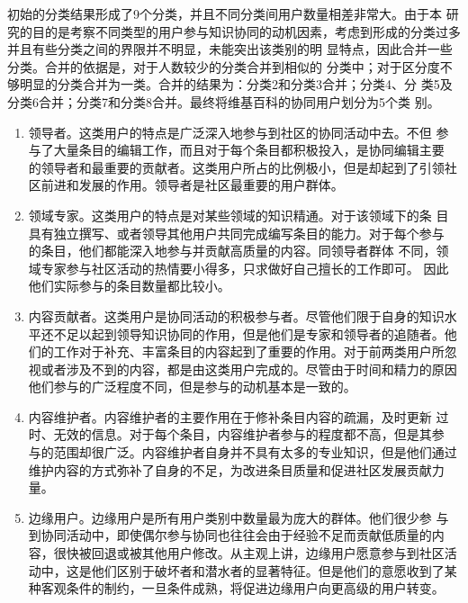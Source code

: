 初始的分类结果形成了9个分类，并且不同分类间用户数量相差非常大。由于本
研究的目的是考察不同类型的用户参与知识协同的动机因素，考虑到形成的分类过多并且有些分类之间的界限并不明显，未能突出该类别的明
显特点，因此合并一些分类。合并的依据是，对于人数较少的分类合并到相似的
分类中；对于区分度不够明显的分类合并为一类。合并的结果为：分类2和分类3合并；分类4、分
类5及分类6合并；分类7和分类8合并。最终将维基百科的协同用户划分为5个类
别。
\begin{enumerate}
\item 领导者。这类用户的特点是广泛深入地参与到社区的协同活动中去。不但
  参与了大量条目的编辑工作，而且对于每个条目都积极投入，是协同编辑主要
  的领导者和最重要的贡献者。这类用户所占的比例极小，但是却起到了引领社
  区前进和发展的作用。领导者是社区最重要的用户群体。
\item 领域专家。这类用户的特点是对某些领域的知识精通。对于该领域下的条
  目具有独立撰写、或者领导其他用户共同完成编写条目的能力。对于每个参与
  的条目，他们都能深入地参与并贡献高质量的内容。同领导者群体
  不同，领域专家参与社区活动的热情要小得多，只求做好自己擅长的工作即可。
  因此他们实际参与的条目数量都比较小。
\item 内容贡献者。这类用户是协同活动的积极参与者。尽管他们限于自身的知识水
  平还不足以起到领导知识协同的作用，但是他们是专家和领导者的追随者。他
  们的工作对于补充、丰富条目的内容起到了重要的作用。对于前两类用户所忽
  视或者涉及不到的内容，都是由这类用户完成的。尽管由于时间和精力的原因
  他们参与的广泛程度不同，但是参与的动机基本是一致的。
\item 内容维护者。内容维护者的主要作用在于修补条目内容的疏漏，及时更新
  过时、无效的信息。对于每个条目，内容维护者参与的程度都不高，但是其参
  与的范围却很广泛。内容维护者自身并不具有太多的专业知识，但是他们通过
  维护内容的方式弥补了自身的不足，为改进条目质量和促进社区发展贡献力量。
\item 边缘用户。边缘用户是所有用户类别中数量最为庞大的群体。他们很少参
  与到协同活动中，即使偶尔参与协同也往往会由于经验不足而贡献低质量的内
  容，很快被回退或被其他用户修改。从主观上讲，边缘用户愿意参与到社区活
  动中，这是他们区别于破坏者和潜水者的显著特征。但是他们的意愿收到了某
  种客观条件的制约，一旦条件成熟，将促进边缘用户向更高级的用户转变。
\end{enumerate}

